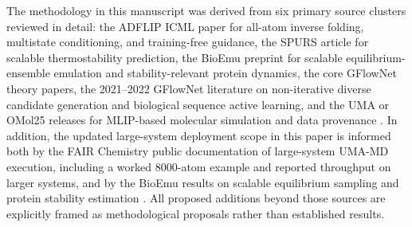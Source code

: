 \documentclass[11pt]{article}
\begin{document}
The methodology in this manuscript was derived from six primary source clusters reviewed in detail: the ADFLIP ICML paper for all-atom inverse folding, multistate conditioning, and training-free guidance, the SPURS article for scalable thermostability prediction, the BioEmu preprint for scalable equilibrium-ensemble emulation and stability-relevant protein dynamics, the core GFlowNet theory papers, the 2021--2022 GFlowNet literature on non-iterative diverse candidate generation and biological sequence active learning, and the UMA or OMol25 releases for MLIP-based molecular simulation and data provenance \citep{yi2025adflip,li2026spurs,lewis2024bioemu,bengio2021noniter,bengio2023gflownet,malkin2022trajectory,madan2023subtb,jain2022bioseqgfn,wood2025uma,levine2025omol25}. In addition, the updated large-system deployment scope in this paper is informed both by the FAIR Chemistry public documentation of large-system UMA-MD execution, including a worked $8000$-atom example and reported throughput on larger systems, and by the BioEmu results on scalable equilibrium sampling and protein stability estimation \citep{fairchem2025github,lewis2024bioemu}. All proposed additions beyond those sources are explicitly framed as methodological proposals rather than established results.
\end{document}
